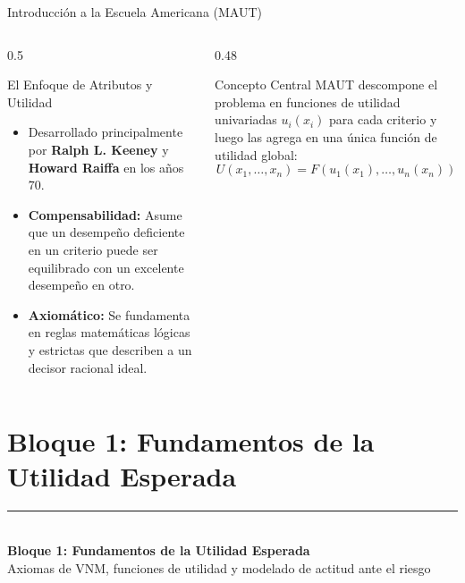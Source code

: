 \documentclass[aspectratio=169, 10pt]{beamer}
\begin{document}
\begin{frame}{Introducción a la Escuela Americana (MAUT)}
    \begin{columns}
        \begin{column}{0.5\textwidth}
            \begin{block}{El Enfoque de Atributos y Utilidad}
                \begin{itemize}
                    \item Desarrollado principalmente por \textbf{Ralph L. Keeney} y \textbf{Howard Raiffa} en los años 70.
                    \item \textbf{Compensabilidad:} Asume que un desempeño deficiente en un criterio puede ser equilibrado con un excelente desempeño en otro.
                    \item \textbf{Axiomático:} Se fundamenta en reglas matemáticas lógicas y estrictas que describen a un decisor racional ideal.
                \end{itemize}
            \end{block}
        \end{column}
        
        \begin{column}{0.48\textwidth}
            \begin{exampleblock}{Concepto Central}
                MAUT descompone el problema en funciones de utilidad univariadas $u_i(x_i)$ para cada criterio y luego las agrega en una única función de utilidad global:
                \begin{equation*}
                    U(x_1, \dots, x_n) = F(u_1(x_1), \dots, u_n(x_n))
                \end{equation*}
            \end{exampleblock}
        \end{column}
    \end{columns}
\end{frame}

\section{Bloque 1: Fundamentos de la Utilidad Esperada}
\begingroup
{}
\begin{frame}[plain]
    \vfill
    \hspace{0.08\paperwidth}%
    {\color{UANLgold}\rule{4cm}{2pt}}\\[8pt]%
    \hspace{0.08\paperwidth}%
    {\color{FIMEwhite}\LARGE\rmfamily\bfseries Bloque 1: Fundamentos de la Utilidad Esperada}\\[6pt]
    \hspace{0.08\paperwidth}%
    {\color{FIMEwhite!85}\large\sffamily Axiomas de VNM, funciones de utilidad y modelado de actitud ante el riesgo}
    \vfill
\end{frame}
\endgroup
\end{document}
